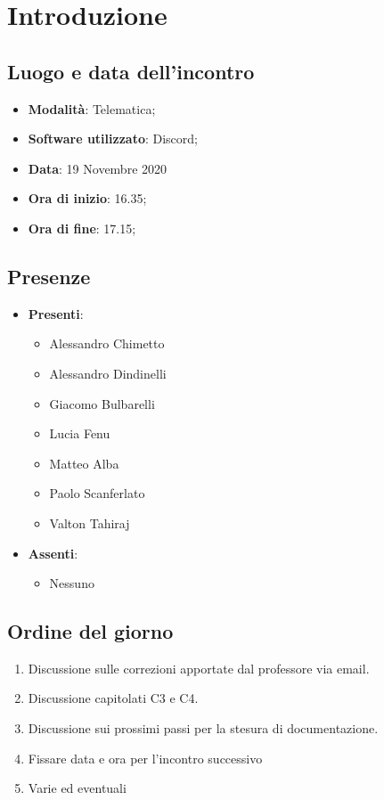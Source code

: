 \documentclass[]{article}
\begin{document}
	
	
	
	\newpage
	
	\section{Introduzione}
\subsection{Luogo e data dell'incontro}
\begin{itemize}
	\item \textbf{Modalità}: Telematica;
	\item \textbf{Software utilizzato}: Discord;
	\item \textbf{Data}: 19 Novembre 2020
	\item \textbf{Ora di inizio}: 16.35;
	\item \textbf{Ora di fine}: 17.15;
\end{itemize}

\subsection{Presenze}
\begin{itemize}
	\item \textbf{Presenti}: 
	\begin{itemize}
		\item Alessandro Chimetto
		\item Alessandro Dindinelli
		\item Giacomo Bulbarelli
		\item Lucia Fenu
		\item Matteo Alba
		\item Paolo Scanferlato
		\item Valton Tahiraj
	\end{itemize}
	\item \textbf{Assenti}:
	\begin{itemize}
		\item Nessuno
	\end{itemize}
\end{itemize}


\subsection{Ordine del giorno}
\begin{enumerate}
	\item Discussione sulle correzioni apportate dal professore via email.
	\item Discussione capitolati C3 e C4.
	\item Discussione sui prossimi passi per la stesura di documentazione.
	\item Fissare data e ora per l'incontro successivo
	\item Varie ed eventuali
\end{enumerate}
\end{document}

